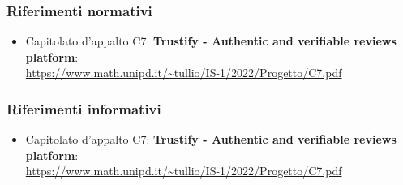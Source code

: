 \subsubsection{Riferimenti normativi}
\begin{itemize}
    \item Capitolato d'appalto C7: \textbf{Trustify - Authentic and verifiable reviews platform}: \\
          \url{https://www.math.unipd.it/~tullio/IS-1/2022/Progetto/C7.pdf}
\end{itemize}
\subsubsection{Riferimenti informativi}
\begin{itemize}
    \item Capitolato d'appalto C7: \textbf{Trustify - Authentic and verifiable reviews platform}: \\
          \url{https://www.math.unipd.it/~tullio/IS-1/2022/Progetto/C7.pdf}
\end{itemize}